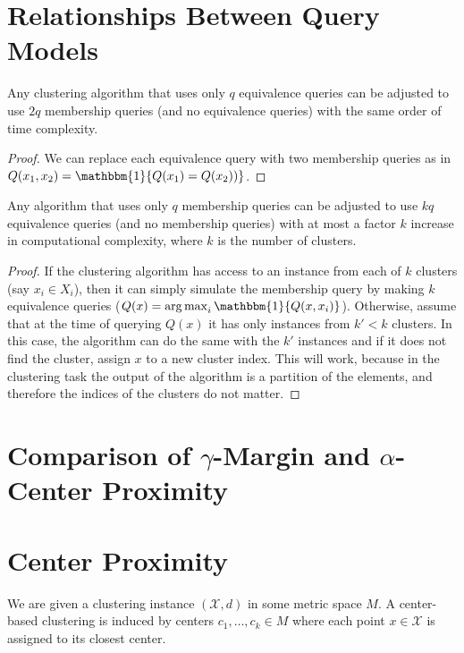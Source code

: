 \documentclass[orivec]{llncs}
\newcommand{\mc}{\mathcal}
\DeclareMathOperator*{\argmax}{arg\,max}
\begin{document}



\appendix
\section{Relationships Between Query Models}
\label{appendix:diffQueryModels}

\begin{proposition}
Any clustering algorithm that uses only $q$ equivalence queries can be adjusted to use $2q$ membership queries (and no equivalence queries) with the same order of time complexity.
\end{proposition}
\begin{proof}
We can replace each equivalence query with two membership queries as in $Q(x_1,x_2)={\mathbbm{1}}\{Q(x_1)=Q(x_2))\}$.
\end{proof}

\begin{proposition}
Any algorithm that uses only $q$ membership queries can be adjusted to use $kq$ equivalence queries (and no membership queries) with at most a factor $k$ increase in computational complexity, where $k$ is the number of clusters.
\end{proposition}
\begin{proof}
If the clustering algorithm has access to an instance from each of $k$ clusters (say $x_i\in X_i$), then it can simply simulate the membership query by making $k$ equivalence queries ($Q(x) = \argmax_{i}\mathbbm{1}\{Q(x, x_i)\}$). Otherwise, assume that at the time of querying $Q(x)$ it has only instances from $k\prime<k$ clusters. In this case, the algorithm can do the same with the $k\prime$ instances and if it does not find the cluster, assign $x$ to a new cluster index. This will work, because in the clustering task the output of the algorithm is a partition of the elements, and therefore the indices of the clusters do not matter.
\end{proof}


\section{Comparison of $\gamma$-Margin and $\alpha$-Center Proximity}
\label{appendix:gammaMrginVsAlphaCenter}



\section{Center Proximity}
We are given a clustering instance $(\mc X, d)$ in some metric space $M$. A center-based clustering is induced by centers $c_1, \ldots, c_k \in M$ where each point $x \in \mc X$ is assigned to its closest center.
\end{document}
